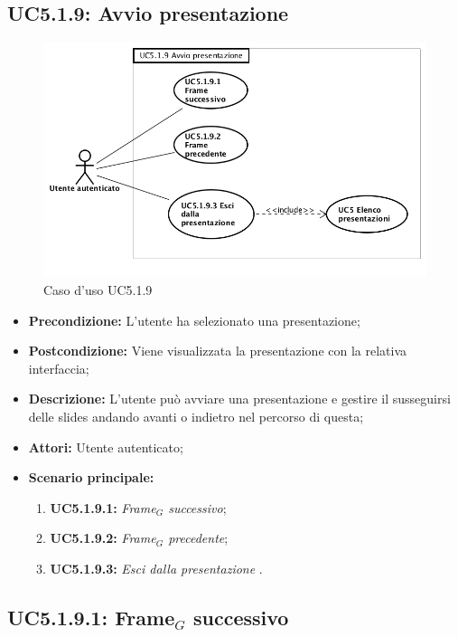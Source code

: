 \newpage
\subsection{ UC5.1.9: Avvio presentazione }

\begin{figure}[h]
	\begin{center}
	\includegraphics[scale=0.4]{diagram/UC5-1-9.png}
	\caption{Caso d'uso UC5.1.9}
	\end{center}
\end{figure}
\begin{itemize}
	\item \textbf{Precondizione:} L'utente ha selezionato una presentazione;
	\item \textbf{Postcondizione:} Viene visualizzata la presentazione con la relativa interfaccia;
	\item \textbf{Descrizione:} L'utente può avviare una presentazione e gestire il susseguirsi delle slides andando avanti o indietro nel percorso di questa;
	\item \textbf{Attori:} Utente autenticato;
	\item \textbf{Scenario principale:}
	\begin{enumerate}
		\item \textbf{ UC5.1.9.1:} \textit{ Frame$_G$ successivo};
		\item \textbf{ UC5.1.9.2:} \textit{ Frame$_G$ precedente};
		\item \textbf{ UC5.1.9.3:} \textit{ Esci dalla presentazione }.
	\end{enumerate}
\end{itemize}
\subsection{ UC5.1.9.1: Frame$_G$ successivo}

